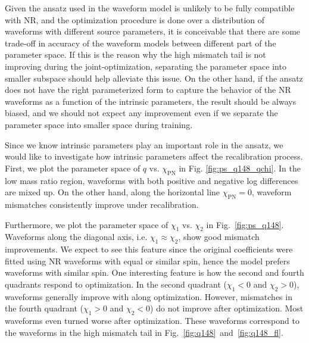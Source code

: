 \documentclass[twocolumn]{aastex631}
\begin{document}

Given the ansatz used in the waveform model is unlikely to be fully compatible with NR, and the optimization procedure is done over a distribution of waveforms with different source parameters, it is conceivable that there are some trade-off in accuracy of the waveform models between different part of the parameter space. If this is the reason why the high mismatch tail is not improving during the joint-optimization, separating the parameter space into smaller subspace should help alleviate this issue. On the other hand, if the ansatz does not have the right parameterized form to capture the behavior of the NR waveforms as a function of the intrinsic parameters, the result should be always biased, and we should not expect any improvement even if we separate the parameter space into smaller space during training.

Since we know intrinsic parameters play an important role in the ansatz, we would like to investigate how intrinsic parameters affect the recalibration process. First, we plot the parameter space of $q$ vs. $\chi_{\mathrm{PN}}$ in Fig. \ref{fig:ps_q148_qchi}. In the low mass ratio region, waveforms with both positive and negative log differences are mixed up. On the other hand, along the horizontal line $\chi_{\mathrm{PN}}=0$, waveform mismatches consistently improve under recalibration. 



Furthermore, we plot the parameter space of $\chi_1$ vs. $\chi_2$ in Fig.~\ref{fig:ps_q148}. Waveforms along the diagonal axis, i.e. $\chi_1\approx\chi_2$, show good mismatch improvements. We expect to see this feature since the original coefficients were fitted using NR waveforms with equal or similar spin, hence the model prefers waveforms with similar spin. One interesting feature is how the second and fourth quadrants respond to optimization. In the second quadrant ($\chi_1<0$ and $\chi_2>0$), waveforms generally improve with along optimization. However, mismatches in the fourth quadrant ($\chi_1>0$ and $\chi_2<0$) do not improve after optimization. Most waveforms even turned worse after optimization. These waveforms correspond to the waveforms in the high mismatch tail in Fig.~\ref{fig:q148}~and~\ref{fig:q148_fl}. 
\end{document}
